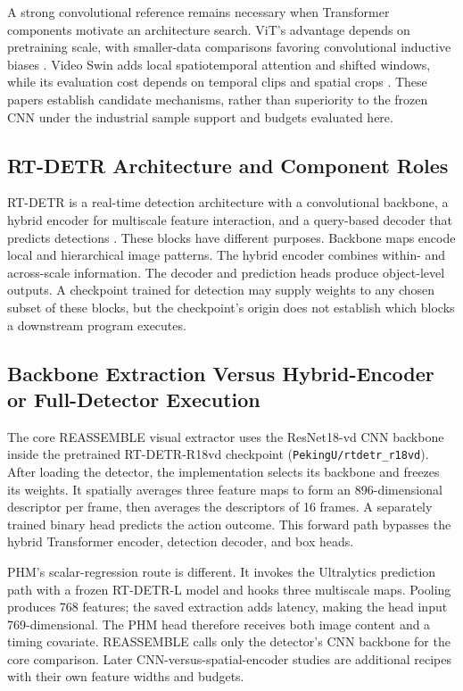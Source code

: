 A strong convolutional reference remains necessary when Transformer components motivate an architecture search. ViT's advantage depends on pretraining scale, with smaller-data comparisons favoring convolutional inductive biases \citep{P010}. Video Swin adds local spatiotemporal attention and shifted windows, while its evaluation cost depends on temporal clips and spatial crops \citep{P013}. These papers establish candidate mechanisms, rather than superiority to the frozen CNN under the industrial sample support and budgets evaluated here.

\subsection{RT-DETR Architecture and Component Roles}
RT-DETR is a real-time detection architecture with a convolutional backbone, a hybrid encoder for multiscale feature interaction, and a query-based decoder that predicts detections \citep{Zhao2024RTDETR}. These blocks have different purposes. Backbone maps encode local and hierarchical image patterns. The hybrid encoder combines within- and across-scale information. The decoder and prediction heads produce object-level outputs. A checkpoint trained for detection may supply weights to any chosen subset of these blocks, but the checkpoint's origin does not establish which blocks a downstream program executes.

\subsection{Backbone Extraction Versus Hybrid-Encoder or Full-Detector Execution}
The core REASSEMBLE visual extractor uses the ResNet18-vd CNN backbone inside the pretrained RT-DETR-R18vd checkpoint (\texttt{PekingU/rtdetr\_r18vd}). After loading the detector, the implementation selects its backbone and freezes its weights. It spatially averages three feature maps to form an 896-dimensional descriptor per frame, then averages the descriptors of 16 frames. A separately trained binary head predicts the action outcome. This forward path bypasses the hybrid Transformer encoder, detection decoder, and box heads.

PHM's scalar-regression route is different. It invokes the Ultralytics prediction path with a frozen RT-DETR-L model and hooks three multiscale maps. Pooling produces 768 features; the saved extraction adds latency, making the head input 769-dimensional. The PHM head therefore receives both image content and a timing covariate. REASSEMBLE calls only the detector's CNN backbone for the core comparison. Later CNN-versus-spatial-encoder studies are additional recipes with their own feature widths and budgets.

